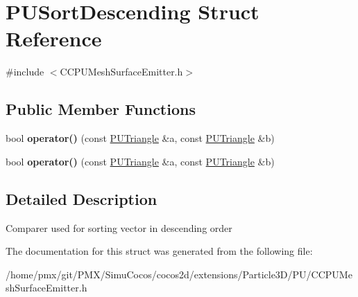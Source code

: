 \hypertarget{structPUSortDescending}{}\section{P\+U\+Sort\+Descending Struct Reference}
\label{structPUSortDescending}


{\ttfamily \#include $<$C\+C\+P\+U\+Mesh\+Surface\+Emitter.\+h$>$}

\subsection*{Public Member Functions}
\begin{DoxyCompactItemize}
\item 
\mbox{\label{structPUSortDescending_a2432cf46f478364504fc327082ed21fd}} 
bool {\bfseries operator()} (const \hyperlink{classPUTriangle}{P\+U\+Triangle} \&a, const \hyperlink{classPUTriangle}{P\+U\+Triangle} \&b)
\item 
\mbox{\label{structPUSortDescending_a2432cf46f478364504fc327082ed21fd}} 
bool {\bfseries operator()} (const \hyperlink{classPUTriangle}{P\+U\+Triangle} \&a, const \hyperlink{classPUTriangle}{P\+U\+Triangle} \&b)
\end{DoxyCompactItemize}


\subsection{Detailed Description}
Comparer used for sorting vector in descending order 

The documentation for this struct was generated from the following file\+:\begin{DoxyCompactItemize}
\item 
/home/pmx/git/\+P\+M\+X/\+Simu\+Cocos/cocos2d/extensions/\+Particle3\+D/\+P\+U/C\+C\+P\+U\+Mesh\+Surface\+Emitter.\+h\end{DoxyCompactItemize}
